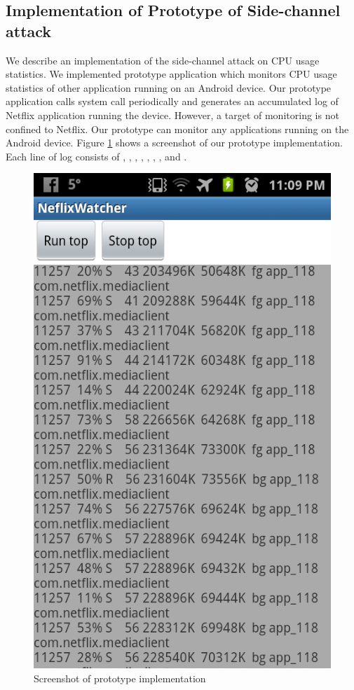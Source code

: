 \subsection{Implementation of Prototype of Side-channel attack}
\label{sec:implementation} 

We describe an implementation of the side-channel attack on CPU usage statistics. 
We implemented prototype application which monitors CPU usage statistics of other application running on an Android device.
Our prototype application calls  system call periodically and generates an accumulated log of Netflix application running the device. 
However, a target of monitoring is not confined to Netflix.
Our prototype can monitor any applications running on the Android device. 
Figure \ref{fig:prototype_screenshot} shows a screenshot of our prototype implementation. 
Each line of log consists of , , , , , , ,  and . 

\begin{figure}[!t]
\centering
\includegraphics[scale=0.20]{Figures/netflix_watcher_screenshot2}
\caption{Screenshot of prototype implementation}
\label{fig:prototype_screenshot}
\end{figure}

